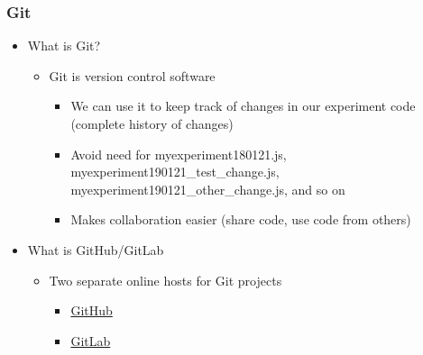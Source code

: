 \documentclass[t]{beamer}
\begin{document}
\begin{frame}[fragile]
    \frametitle{Git}
    \begin{itemize}
        \item What is Git?
            \begin{itemize}\scriptsize
                \item Git is version control software
                    \begin{itemize}\tiny
                        \item We can use it to keep track of changes in our experiment code (complete history of changes)
                        \item Avoid need for myexperiment180121.js, myexperiment190121\_test\_change.js, myexperiment190121\_other\_change.js, and so on
                        \item Makes collaboration easier (share code, use code from others)
                    \end{itemize}
            \end{itemize}
        \item What is GitHub/GitLab
            \begin{itemize}
                \item Two separate online hosts for Git projects
                    \begin{itemize}\tiny
                        \item \href{https://github.com/}{GitHub}
                        \item \href{https://gitlab.com/}{GitLab}
                    \end{itemize}\tiny
            \end{itemize}
    \end{itemize}
\end{frame}
\end{document}

